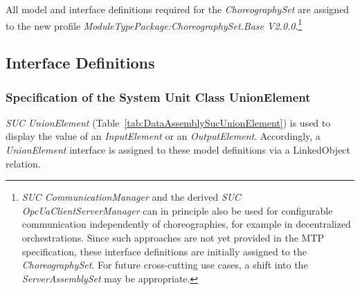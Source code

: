 All model and interface definitions required for the \emph{ChoreographySet} are assigned to the new profile \emph{ModuleTypePackage:ChoreographySet.Base V2.0.0}.\footnote{\emph{SUC CommunicationManager} and the derived \emph{SUC OpcUaClientServerManager} can in principle also be used for configurable communication independently of choreographies, for example in decentralized orchestrations. Since such approaches are not yet provided in the MTP specification, these interface definitions are initially assigned to the \emph{ChoreographySet}. For future cross-cutting use cases, a shift into the \emph{ServerAssemblySet} \cite{PNO.2025.Part5.1} may be appropriate. }

\subsection{Interface Definitions}
\label{subsec:AnhangChoreographySetSchnittstellen}

\subsubsection{Specification of the System Unit Class UnionElement}

\emph{SUC UnionElement} (Table~\ref{tab:DataAssemblySucUnionElement}) is used to display the value of an \emph{InputElement} or an \emph{OutputElement}. Accordingly, a \emph{UnionElement} interface is assigned to these model definitions via a LinkedObject relation.

